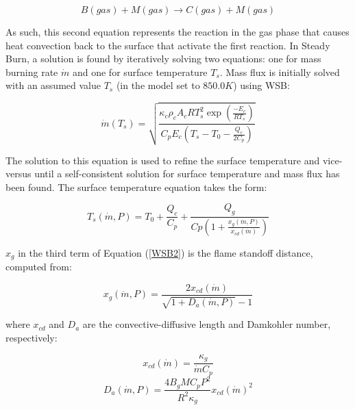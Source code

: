 \begin{equation}
B(gas)+M(gas)\rightarrow C(gas)+M(gas)
\end{equation}

As such, this second equation represents the reaction in the gas phase that causes heat convection back to the surface that activate the first reaction.  In Steady Burn, a solution is found by iteratively solving two equations: one for mass burning rate $\dot{m}$ and one for surface temperature $T_s$.  Mass flux is initially solved with an assumed value $T_s$ (in the model set to $850.0 K$) using WSB:

\begin{equation}
\dot{m}\left(T_s\right)=\sqrt{\frac{\displaystyle \kappa_c \rho_c A_c R T_s^2 \exp\left({\frac{\displaystyle -E_c}{\displaystyle R T_s}}\right)}{\displaystyle C_p E_c \left(T_s - T_0 - \frac{Q_c}{2 C_p}\right)}}
\label{WSB1}
\end{equation}

The solution to this equation is used to refine the surface temperature and vice-versus until a self-consistent solution for surface temperature and mass flux has been found.  The surface temperature equation takes the form:

\begin{equation}
T_s(\dot{m},P)=T_0 + \frac{\displaystyle Q_c}{\displaystyle C_p} + \frac{Q_g}{Cp\left(1+\frac{\displaystyle x_g\left(\dot{m},P\right)}{\displaystyle x_{cd}(\dot{m})}\right)}
\label{WSB2}
\end{equation}

$x_g$ in the third term of Equation (\ref{WSB2}) is the flame standoff distance, computed from:

\begin{equation}
x_g\left(\dot{m},P\right)=\frac{2 x_{cd}\left(\dot{m}\right)}{\displaystyle \sqrt{1 + D_a\left(\dot{m},P\right)} - 1}
\label{WSB3}
\end{equation}

where $x_{cd}$ and $D_a$ are the convective-diffusive length and Damkohler number, respectively:

\begin{equation}
x_{cd} \left(\dot{m}\right)=\frac{\kappa_g}{\displaystyle \dot{m} C_p}
\label{WSB4}
\end{equation}
\begin{equation}
D_a\left(\dot{m},P\right) = \frac{4 B_g M C_p P^2}{\displaystyle R^2 \kappa_g} x_{cd}\left(\dot{m}\right)^2
\label{WSB5}
\end{equation}


